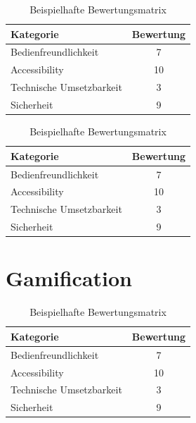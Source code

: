 \begin{table}[h!]
    \caption{Beispielhafte Bewertungsmatrix}
    \begin{center}
        \begin{tabular}{l|c}
            Kategorie                       & Bewertung \\\hline
            Bedienfreundlichkeit                         & 7         \\
            Accessibility                   & 10        \\
            Technische Umsetzbarkeit        & 3         \\
            Sicherheit                      & 9         
        \end{tabular}
    \end{center}
\end{table}

\begin{table}[h!]
    \caption{Beispielhafte Bewertungsmatrix}
    \begin{center}
        \begin{tabular}{l|c}
            Kategorie                       & Bewertung \\\hline
            Bedienfreundlichkeit                         & 7         \\
            Accessibility                   & 10        \\
            Technische Umsetzbarkeit        & 3         \\
            Sicherheit                      & 9         
        \end{tabular}
    \end{center}
\end{table}

\section{Gamification}

\begin{table}[h!]
    \caption{Beispielhafte Bewertungsmatrix}
    \begin{center}
        \begin{tabular}{l|c}
            Kategorie                       & Bewertung \\\hline
            Bedienfreundlichkeit                         & 7         \\
            Accessibility                   & 10        \\
            Technische Umsetzbarkeit        & 3         \\
            Sicherheit                      & 9         
        \end{tabular}
    \end{center}
\end{table}

